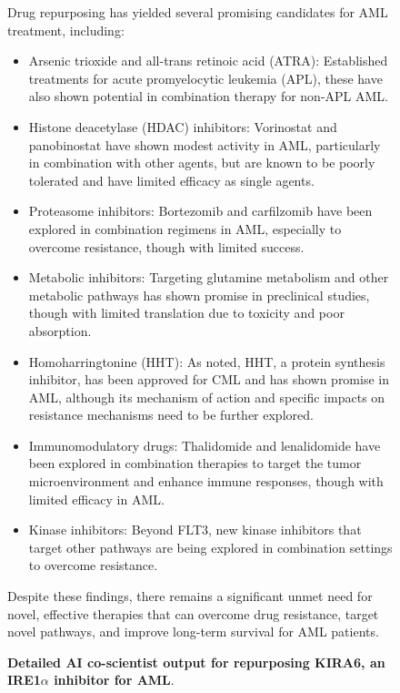 \begin{figure}[htbp!]
\begin{tcolorbox}[
    colback=black!5!white,
    colframe=black!60!white,
    title=\textbf{KIRA6 for AML},
    fonttitle=\bfseries,
    arc=3mm,
    boxrule=1pt,
    bottomrule=2pt,
]
Drug repurposing has yielded several promising candidates for AML treatment, including:
\begin{itemize}
    \item Arsenic trioxide and all-trans retinoic acid (ATRA):  Established treatments for acute promyelocytic leukemia (APL), these have also shown potential in combination therapy for non-APL AML.
    \item Histone deacetylase (HDAC) inhibitors:  Vorinostat and panobinostat have shown modest activity in AML, particularly in combination with other agents, but are known to be poorly tolerated and have limited efficacy as single agents.
    \item Proteasome inhibitors: Bortezomib and carfilzomib have been explored in combination regimens in AML, especially to overcome resistance, though with limited success.
    \item Metabolic inhibitors: Targeting glutamine metabolism and other metabolic pathways has shown promise in preclinical studies, though with limited translation due to toxicity and poor absorption.
    \item Homoharringtonine (HHT):  As noted, HHT, a protein synthesis inhibitor, has been approved for CML and has shown promise in AML, although its mechanism of action and specific impacts on resistance mechanisms need to be further explored.
    \item Immunomodulatory drugs: Thalidomide and lenalidomide have been explored in combination therapies to target the tumor microenvironment and enhance immune responses, though with limited efficacy in AML.
    \item Kinase inhibitors: Beyond FLT3, new kinase inhibitors that target other pathways are being explored in combination settings to overcome resistance.
\end{itemize}
Despite these findings, there remains a significant unmet need for novel, effective therapies that can overcome drug resistance, target novel pathways, and improve long-term survival for AML patients.

\end{tcolorbox}
\vspace{0.1cm}
\caption{\textbf{Detailed AI co-scientist output for repurposing KIRA6, an IRE1$\alpha$ inhibitor for AML}.}
\label{fig:ex_kira6_1}
\end{figure}


